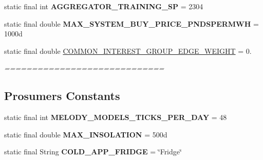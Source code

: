 \begin{DoxyCompactItemize}
\item 
\hypertarget{classuk_1_1ac_1_1dmu_1_1iesd_1_1cascade_1_1base_1_1_consts_a57c532a55ab8a0b7b39126e8e4dd5f77}{static final int {\bfseries A\-G\-G\-R\-E\-G\-A\-T\-O\-R\-\_\-\-T\-R\-A\-I\-N\-I\-N\-G\-\_\-\-S\-P} = 2304}\label{classuk_1_1ac_1_1dmu_1_1iesd_1_1cascade_1_1base_1_1_consts_a57c532a55ab8a0b7b39126e8e4dd5f77}

\item 
\hypertarget{classuk_1_1ac_1_1dmu_1_1iesd_1_1cascade_1_1base_1_1_consts_adbfa6373ce32707c0ba3988ceaae3410}{static final double {\bfseries M\-A\-X\-\_\-\-S\-Y\-S\-T\-E\-M\-\_\-\-B\-U\-Y\-\_\-\-P\-R\-I\-C\-E\-\_\-\-P\-N\-D\-S\-P\-E\-R\-M\-W\-H} = 1000d}\label{classuk_1_1ac_1_1dmu_1_1iesd_1_1cascade_1_1base_1_1_consts_adbfa6373ce32707c0ba3988ceaae3410}

\item 
\hypertarget{classuk_1_1ac_1_1dmu_1_1iesd_1_1cascade_1_1base_1_1_consts_a47858e427c9909cebdfaee35805c33d2}{static final double \hyperlink{classuk_1_1ac_1_1dmu_1_1iesd_1_1cascade_1_1base_1_1_consts_a47858e427c9909cebdfaee35805c33d2}{C\-O\-M\-M\-O\-N\-\_\-\-I\-N\-T\-E\-R\-E\-S\-T\-\_\-\-G\-R\-O\-U\-P\-\_\-\-E\-D\-G\-E\-\_\-\-W\-E\-I\-G\-H\-T} = 0.}\label{classuk_1_1ac_1_1dmu_1_1iesd_1_1cascade_1_1base_1_1_consts_a47858e427c9909cebdfaee35805c33d2}

\begin{DoxyCompactList}\small\item\em ============================= \subsection*{Prosumers Constants }\end{DoxyCompactList}\item 
\hypertarget{classuk_1_1ac_1_1dmu_1_1iesd_1_1cascade_1_1base_1_1_consts_ac44588425f5eb78d06513a4f0c622a35}{static final int {\bfseries M\-E\-L\-O\-D\-Y\-\_\-\-M\-O\-D\-E\-L\-S\-\_\-\-T\-I\-C\-K\-S\-\_\-\-P\-E\-R\-\_\-\-D\-A\-Y} = 48}\label{classuk_1_1ac_1_1dmu_1_1iesd_1_1cascade_1_1base_1_1_consts_ac44588425f5eb78d06513a4f0c622a35}

\item 
\hypertarget{classuk_1_1ac_1_1dmu_1_1iesd_1_1cascade_1_1base_1_1_consts_a8105ddea51d71c2e8bef23925c7327f1}{static final double {\bfseries M\-A\-X\-\_\-\-I\-N\-S\-O\-L\-A\-T\-I\-O\-N} = 500d}\label{classuk_1_1ac_1_1dmu_1_1iesd_1_1cascade_1_1base_1_1_consts_a8105ddea51d71c2e8bef23925c7327f1}

\item 
\hypertarget{classuk_1_1ac_1_1dmu_1_1iesd_1_1cascade_1_1base_1_1_consts_ab07f62337cc18ab080267169025c817d}{static final String {\bfseries C\-O\-L\-D\-\_\-\-A\-P\-P\-\_\-\-F\-R\-I\-D\-G\-E} = \char`\"{}Fridge\char`\"{}}\label{classuk_1_1ac_1_1dmu_1_1iesd_1_1cascade_1_1base_1_1_consts_ab07f62337cc18ab080267169025c817d}


\end{DoxyCompactItemize}
